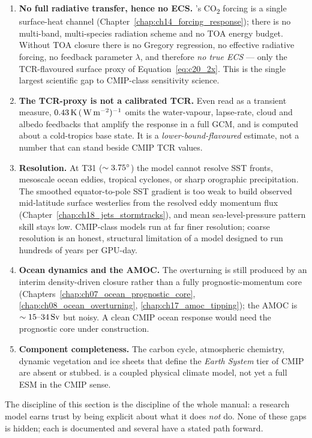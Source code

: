\begin{enumerate}[leftmargin=2em]
\item \textbf{No full radiative transfer, hence no ECS.} \model{}'s CO\textsubscript{2}
  forcing is a single surface-heat channel (Chapter~\ref{chap:ch14_forcing_response});
  there is no multi-band, multi-species radiation scheme and no TOA energy budget.
  Without TOA closure there is no Gregory regression, no effective radiative forcing,
  no feedback parameter $\lambda$, and therefore \emph{no true ECS} --- only the
  TCR-flavoured surface proxy of Equation~\eqref{eq:c20_2x}. This is the single
  largest scientific gap to CMIP-class sensitivity science.
\item \textbf{The TCR-proxy is not a calibrated TCR.} Even read as a transient
  measure, $0.43\,\mathrm{K}\,(\,\mathrm{W\,m^{-2}})^{-1}$ omits the water-vapour, lapse-rate, cloud
  and albedo feedbacks that amplify the response in a full GCM, and is computed
  about a cold-tropics base state. It is a \emph{lower-bound-flavoured} estimate, not
  a number that can stand beside CMIP TCR values.
\item \textbf{Resolution.} At T31 ($\sim 3.75^{\circ}$) the model cannot resolve SST
  fronts, mesoscale ocean eddies, tropical cyclones, or sharp orographic
  precipitation. The smoothed equator-to-pole SST gradient is too weak to build
  observed mid-latitude surface westerlies from the resolved eddy momentum flux
  (Chapter~\ref{chap:ch18_jets_stormtracks}), and mean sea-level-pressure pattern
  skill stays low. CMIP-class models run at far finer resolution; coarse resolution
  is an honest, structural limitation of a model designed to run hundreds of years
  per GPU-day.
\item \textbf{Ocean dynamics and the AMOC.} The overturning is still produced by an
  interim density-driven closure rather than a fully prognostic-momentum core
  (Chapters~\ref{chap:ch07_ocean_prognostic_core},
  \ref{chap:ch08_ocean_overturning}, \ref{chap:ch17_amoc_tipping}); the AMOC is
  $\sim 15\text{--}34\,\mathrm{Sv}$ but noisy. A clean CMIP ocean response would need the
  prognostic core under construction.
\item \textbf{Component completeness.} The carbon cycle, atmospheric chemistry,
  dynamic vegetation and ice sheets that define the \emph{Earth System} tier of
  CMIP are absent or stubbed. \model{} is a coupled physical climate model, not yet
  a full ESM in the CMIP sense.
\end{enumerate}

The discipline of this section is the discipline of the whole manual: a research
model earns trust by being explicit about what it does \emph{not} do. None of these
gaps is hidden; each is documented and several have a stated path forward.

